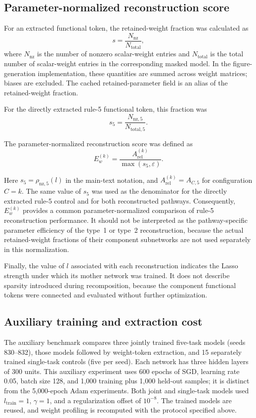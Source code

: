 \documentclass{article}
\begin{document}
\subsection{Parameter-normalized reconstruction score}

For an extracted functional token, the retained-weight fraction was calculated as
\[
s
=
\frac{
N_{\mathrm{nz}}
}{
N_{\mathrm{total}}
},
\]
where $N_{\mathrm{nz}}$ is the number of nonzero scalar-weight entries and $N_{\mathrm{total}}$ is the total number of scalar-weight entries in the corresponding masked model. In the figure-generation implementation, these quantities are summed across weight matrices; biases are excluded. The cached retained-parameter field is an alias of the retained-weight fraction.

For the directly extracted rule-5 functional token, this fraction was
\[
s_5
=
\frac{
N_{\mathrm{nz},5}
}{
N_{\mathrm{total},5}
}.
\]

The parameter-normalized reconstruction score was defined as
\[
E_w^{(k)}
=
\frac{
A_{\mathrm{rel}}^{(k)}
}{
\max(s_5,\varepsilon)
}.
\]

Here $s_5=\rho_{\mathrm{nz},5}(l)$ in the main-text notation, and $A_{\mathrm{rel}}^{(k)}=A_{C,5}$ for configuration $C=k$. The same value of $s_5$ was used as the denominator for the directly extracted rule-5 control and for both reconstructed pathways. Consequently, $E_w^{(k)}$ provides a common parameter-normalized comparison of rule-5 reconstruction performance. It should not be interpreted as the pathway-specific parameter efficiency of the type~1 or type~2 reconstruction, because the actual retained-weight fractions of their component subnetworks are not used separately in this normalization.

Finally, the value of $l$ associated with each reconstruction indicates the Lasso strength under which its mother network was trained. It does not describe sparsity introduced during recomposition, because the component functional tokens were connected and evaluated without further optimization.



\subsection{Auxiliary training and extraction cost}
\label{supp:training_cost}

The auxiliary benchmark compares three jointly trained five-task models (seeds 830--832), those models followed by weight-token extraction, and 15 separately trained single-task controls (five per seed). Each network has three hidden layers of 300 units. This auxiliary experiment uses 600 epochs of SGD, learning rate 0.05, batch size 128, and 1,000 training plus 1,000 held-out samples; it is distinct from the 5,000-epoch Adam experiments. Both joint and single-task models used $l_{\mathrm{train}}=1$, $\gamma=1$, and a regularization offset of $10^{-8}$. The trained models are reused, and weight profiling is recomputed with the protocol specified above.
\end{document}
